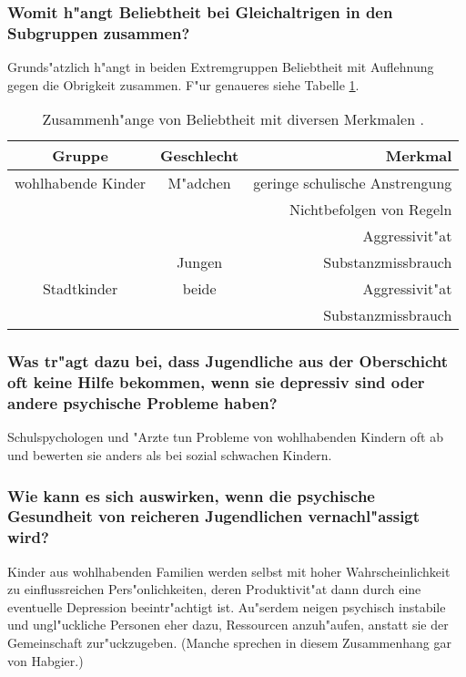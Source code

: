 \subsubsection{Womit h"angt Beliebtheit bei Gleichaltrigen in den Subgruppen zusammen?}
Grunds"atzlich h"angt in beiden Extremgruppen Beliebtheit mit Auflehnung gegen die Obrigkeit zusammen. F"ur genaueres siehe Tabelle \ref{tab:peerstatus}.
\begin{table}
        \centering
        \begin{tabular}{c | c | r}
                \hline
                Gruppe & Geschlecht & Merkmal\\
                \hline
                \hline
                wohlhabende Kinder & M"adchen & geringe schulische Anstrengung\\
                & & Nichtbefolgen von Regeln\\
                & & Aggressivit"at\\
                & Jungen & Substanzmissbrauch\\
                \hline
                Stadtkinder & beide & Aggressivit"at\\
                & & Substanzmissbrauch\\
                \hline
        \end{tabular}
        \caption{Zusammenh"ange von Beliebtheit mit diversen Merkmalen \parencite{luthar_children_2005}.}
        \label{tab:peerstatus}
\end{table}

\subsubsection{Was tr"agt dazu bei, dass Jugendliche aus der Oberschicht oft keine Hilfe bekommen, wenn sie depressiv sind oder andere psychische Probleme haben?}
Schulspychologen und "Arzte tun Probleme von wohlhabenden Kindern oft ab und bewerten sie anders als bei sozial schwachen Kindern. 

\subsubsection{Wie kann es sich auswirken, wenn die psychische Gesundheit von reicheren Jugendlichen vernachl"assigt wird?}
Kinder aus wohlhabenden Familien werden selbst mit hoher Wahrscheinlichkeit zu einflussreichen Pers"onlichkeiten, deren Produktivit"at dann durch eine eventuelle Depression beeintr"achtigt ist. Au"serdem neigen psychisch instabile und ungl"uckliche Personen eher dazu, Ressourcen anzuh"aufen, anstatt sie der Gemeinschaft zur"uckzugeben. (Manche sprechen in diesem Zusammenhang gar von Habgier.)
